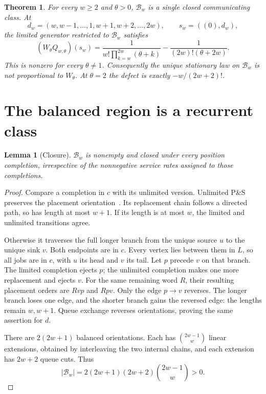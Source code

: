 \documentclass[11pt]{article}
\newtheorem{theorem}{Theorem}
\newtheorem{lemma}{Lemma}
\newcommand{\B}{\mathcal B_w}
\newcommand{\Qw}{Q_{w,\theta}}
\newcommand{\W}{W_\theta}
\begin{document}
\begin{theorem}\label{thm:main}
For every $w\ge2$ and $\theta>0$, $\B$ is a single closed communicating class. At
\[
 d_w=(w,w-1,\ldots,1,w+1,w+2,\ldots,2w),\qquad
 s_w=((0),d_w),
\]
the limited generator restricted to $\B$ satisfies
\begin{equation}\label{eq:main}
 (\W\Qw)(s_w)=
 \frac{1}{w!\prod_{k=w}^{2w}(\theta+k)}
 -\frac{1}{(2w)!(\theta+2w)}.
\end{equation}
This is nonzero for every $\theta\ne1$. Consequently the unique stationary law on $\B$ is not proportional to $\W$. At $\theta=2$ the defect is exactly $-w/(2w+2)!$.
\end{theorem}

\newpage
\section{The balanced region is a recurrent class}
\begin{lemma}[Closure]\label{lem:closure}
$\B$ is nonempty and closed under every position completion, irrespective of the nonnegative service rates assigned to those completions.
\end{lemma}
\begin{proof}
Compare a completion in $c$ with its unlimited version. Unlimited P\&S preserves the placement orientation~\cite[Lemma 1, p.\ 217]{DG}. Its replacement chain follows a directed path, so has length at most $w+1$. If its length is at most $w$, the limited and unlimited transitions agree.

Otherwise it traverses the full longer branch from the unique source $u$ to the unique sink $v$. Both endpoints are in $c$. Every vertex lies between them in $L$, so all jobs are in $c$, with $u$ its head and $v$ its tail. Let $p$ precede $v$ on that branch. The limited completion ejects $p$; the unlimited completion makes one more replacement and ejects $v$. For the same remaining word $R$, their resulting placement orders are $Rvp$ and $Rpv$. Only the edge $p\to v$ reverses. The longer branch loses one edge, and the shorter branch gains the reversed edge: the lengths remain $w,w+1$. Queue exchange reverses orientations, proving the same assertion for $d$.

There are $2(2w+1)$ balanced orientations. Each has $\binom{2w-1}{w}$ linear extensions, obtained by interleaving the two internal chains, and each extension has $2w+2$ queue cuts. Thus
\[
 |\B|=2(2w+1)(2w+2)\binom{2w-1}{w}>0.
\]
\end{proof}
\end{document}
